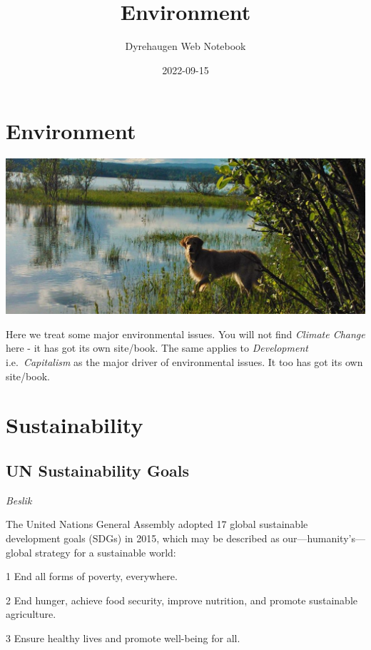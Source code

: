 \documentclass[
]{book}
\title{Environment}
\author{Dyrehaugen Web Notebook}
\date{2022-09-15}
\begin{document}
\maketitle

{
\setcounter{tocdepth}{1}
\tableofcontents
}
\hypertarget{environment}{%
\chapter{Environment}\label{environment}}

\includegraphics{fig/zelda.jpg}

Here we treat some major environmental issues.
You will not find \emph{Climate Change} here - it has got its own site/book.
The same applies to \emph{Development} i.e.~\emph{Capitalism} as the major
driver of environmental issues.
It too has got its own site/book.

\hypertarget{sustainability}{%
\chapter{Sustainability}\label{sustainability}}

\hypertarget{un-sustainability-goals}{%
\section{UN Sustainability Goals}\label{un-sustainability-goals}}

\emph{Beslik}

The United Nations General Assembly adopted 17 global sustainable development goals (SDGs) in 2015, which may be described as our---humanity's---global strategy for a sustainable world:

1 End all forms of poverty, everywhere.

2 End hunger, achieve food security, improve nutrition, and promote sustainable agriculture.

3 Ensure healthy lives and promote well-being for all.
\end{document}
